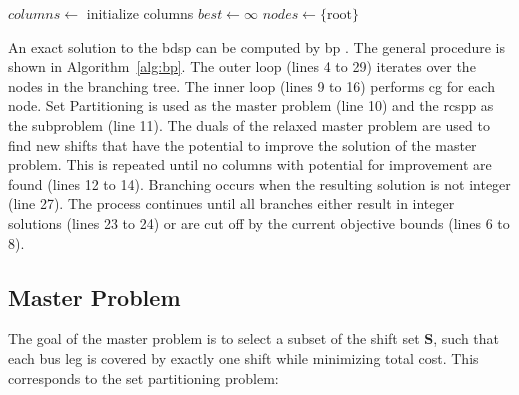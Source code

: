 \documentclass[]{amsart}
\theoremstyle{plain}
\begin{document}
\begin{algorithm}[t]
    \caption{Branch and Price}
    \label{alg:bp}

    $columns\gets$ initialize columns\;
    $best\gets\infty$\;
    $nodes \gets \{\mathrm{root}\}$\;
    \;
\end{algorithm}

An exact solution to the \gls{bdsp} can be computed by \acrfull{bp} \cite{barnhart1998branch}. The general procedure is shown in Algorithm~\ref{alg:bp}. The outer loop (lines 4 to 29) iterates over the nodes in the branching tree. The inner loop (lines 9 to 16) performs \acrfull{cg} for each node. Set Partitioning is used as the master problem (line 10) and the \acrfull{rcspp} as the subproblem (line 11). The duals of the relaxed master problem are used to find new shifts that have the potential to improve the solution of the master problem. This is repeated until no columns with potential for improvement are found (lines 12 to 14). Branching occurs when the resulting solution is not integer (line 27). The process continues until all branches either result in integer solutions (lines 23 to 24) or are cut off by the current objective bounds (lines 6 to 8).

\subsection{Master Problem}
\label{sec:master}

The goal of the master problem is to select a subset of the shift set $\mathbf{S}$, such that each bus leg is covered by exactly one shift while minimizing total cost. This corresponds to the set partitioning problem:
\end{document}

